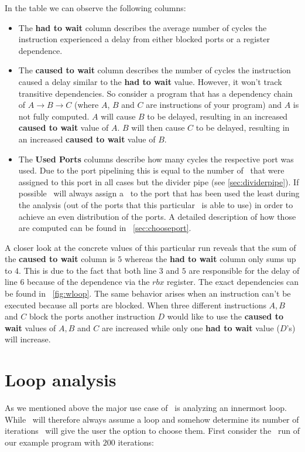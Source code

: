 In the table we can observe the following columns:
\begin{itemize}
    \item The \textbf{had to wait} column describes the average number of cycles the instruction experienced a delay from either blocked ports or a register dependence. 
    \item The \textbf{caused to wait} column describes the number of cycles the instruction caused a delay similar to the \textbf{had to wait} value. However, it won't track transitive dependencies. So consider a program that has a dependency chain of $A \rightarrow B \rightarrow C$ (where $A$, $B$ and $C$ are instructions of your program) and $A$ is not fully computed. $A$ will cause $B$ to be delayed, resulting in an increased \textbf{caused to wait} value of $A$. $B$ will then cause $C$ to be delayed, resulting in an increased \textbf{caused to wait} value of $B$.
    \item The \textbf{Used Ports} columns describe how many cycles the respective port was used. Due to the port pipelining this is equal to the number of \microops\ that were assigned to this port in all cases but the divider pipe (see \autoref{sec:dividerpipe}). If possible \suaca\ will always assign a \microop\ to the port that has been used the least during the analysis (out of the ports that this particular \microop\ is able to use) in order to achieve an even distribution of the ports. A detailed description of how those are computed can be found in ~\autoref{sec:chooseport}.
\end{itemize}

A closer look at the concrete values of this particular run reveals that the sum of the \textbf{caused to wait} column is $5$ whereas the \textbf{had to wait} column only sums up to $4$. This is due to the fact that both line $3$ and $5$ are responsible for the delay of line $6$ because of the dependence via the $rbx$ register. The exact dependencies can be found in ~\autoref{fig:wloop}. The same behavior arises when an instruction can't be executed because all ports are blocked. When three different instructions $A, B$ and $C$ block the ports another instruction $D$ would like to use the \textbf{caused to wait} values of $A, B$ and $C$ are increased while only one \textbf{had to wait} value ($D$'s) will increase.




\section{Loop analysis}
\label{sec:loop}
As we mentioned above the major use case of \iaca\ is analyzing an innermost loop. While \iaca\ will therefore always assume a loop and somehow determine its number of iterations \suaca\ will give the user the option to choose them. First consider the \suaca\ run of our example program with $200$ iterations:

